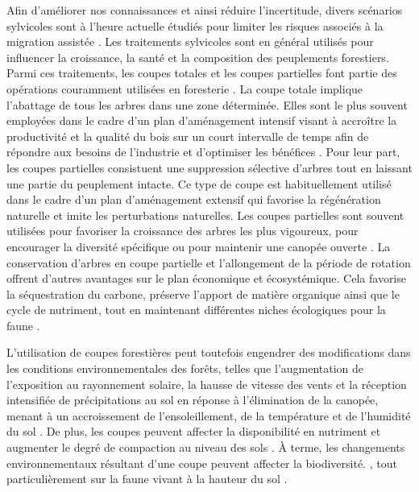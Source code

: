 Afin d'améliorer nos connaissances et ainsi réduire l'incertitude, divers scénarios sylvicoles sont à l'heure actuelle étudiés pour limiter les risques associés à la migration assistée \citep{royoDesiredREgenerationAssisted2023}.
Les traitements sylvicoles sont en général utilisés pour influencer la croissance, la santé et la composition des peuplements forestiers.
Parmi ces traitements, les coupes totales et les coupes partielles font partie des opérations couramment utilisées en foresterie \citep{Man2008Elevenyearresponses,Chaudhary2016Impactforest,MontoroGirona2018ConiferRegeneration,Ameray2021Forestcarbon}. 
La coupe totale implique l'abattage de tous les arbres dans une zone déterminée.
Elles sont le plus souvent employées dans le cadre d'un plan d'aménagement intensif visant à accroître la productivité et la qualité du bois 
sur un court intervalle de temps afin de répondre aux besoins de l'industrie et d'optimiser les bénéfices \citep{Ameray2021Forestcarbon}.
Pour leur part, les coupes partielles consistuent une suppression sélective d'arbres tout en laissant une partie du peuplement intacte.
Ce type de coupe est habituellement utilisé dans le cadre d'un plan d'aménagement extensif qui favorise la régénération naturelle et imite les perturbations naturelles.
Les coupes partielles sont souvent utilisées pour favoriser la croissance des arbres les plus vigoureux, pour encourager la diversité spécifique ou pour maintenir une canopée ouverte \citep{Irland2011Timberproductivity,Ameray2021Forestcarbon}.
La conservation d'arbres en coupe partielle et l'allongement de la période de rotation offrent d'autres avantages sur le plan économique et écosystémique. 
Cela favorise la séquestration du carbone, préserve l'apport de matière organique ainsi que le cycle de nutriment, 
tout en maintenant différentes niches écologiques pour la faune \citep{Barg1999Influencepartial,Tong2020Forestmanagement,Ameray2021Forestcarbon}.

L'utilisation de coupes forestières peut toutefois engendrer des modifications dans les conditions environnementales des forêts, 
telles que l'augmentation de l'exposition au rayonnement solaire, la hausse de vitesse des vents et la réception intensifiée de précipitations au sol en réponse à l'élimination de la canopée, 
menant à un accroissement de l'ensoleillement, de la température et de l'humidité du sol \citep{Keenan1993ecologicaleffects,Lindo2003Microbialbiomass,Heithecker2007Edgerelatedgradients}.
De plus, les coupes peuvent affecter la disponibilité en nutriment et augmenter le degré de compaction au niveau des sols \citep{Covington1981Changesforest,Lindo2003Microbialbiomass,Battigelli2004Shorttermimpact,rousseauLongtermEffectsBiomass2018}. 
À terme, les changements environnementaux résultant d'une coupe peuvent affecter la biodiversité. \citep{Paillet2010Biodiversitydifferences,Fedrowitz2014Canretention,Chaudhary2016Impactforest}, 
tout particulièrement sur la faune vivant à la hauteur du sol \citep{Lindo2003Microbialbiomass,Chaudhary2016Impactforest,Kudrin2023metaanalysiseffects}.



